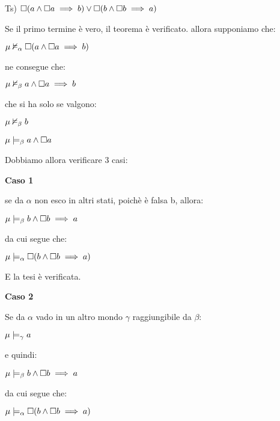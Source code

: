 Ts) $\square(a\wedge\square a\implies b)\vee\square(b\wedge\square b\implies a)$

Se il primo termine è vero, il teorema è verificato. allora supponiamo
che:

$\mu\nvDash_{\alpha}\square(a\wedge\square a\implies b)$

ne consegue che:

$\mu\nvDash_{\beta}a\wedge\square a\implies b$

che si ha solo se valgono:

$\mu\nvDash_{\beta}b$

$\mu\models_{\beta}a\wedge\square a$

Dobbiamo allora verificare 3 casi:

\textbf{Caso 1 }

se da $\alpha$ non esco in altri stati, poichè è falsa b, allora:

$\mu\models_{\beta}b\wedge\square b\implies a$

da cui segue che:

$\mu\models_{\alpha}\square(b\wedge\square b\implies a)$

E la tesi è verificata.

\begin{center} 
\end{center}

\textbf{Caso 2 }

Se da $\alpha$ vado in un altro mondo $\gamma$ raggiungibile da
$\beta$:

$\mu\models_{\gamma}a$

e quindi:

$\mu\models_{\beta}b\wedge\square b\implies a$

da cui segue che:

$\mu\models_{\alpha}\square(b\wedge\square b\implies a)$

